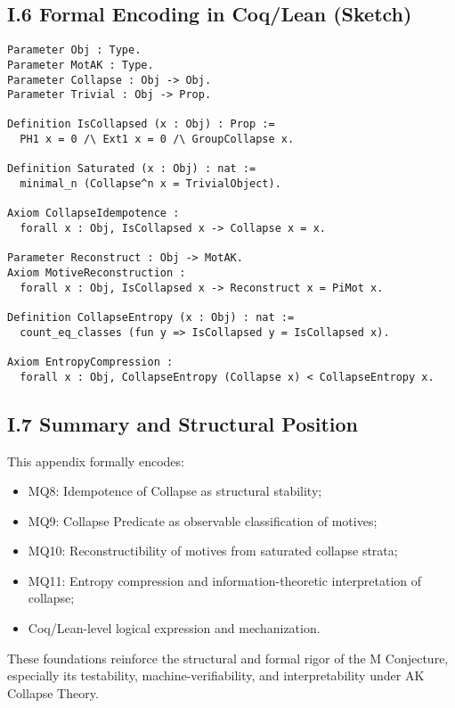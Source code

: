 \documentclass[11pt]{article}
\begin{document}
\subsection*{I.6 Formal Encoding in Coq/Lean (Sketch)}

\begin{lstlisting}[language=Coq, caption=Collapse Predicate Encoding in Coq]
Parameter Obj : Type.
Parameter MotAK : Type.
Parameter Collapse : Obj -> Obj.
Parameter Trivial : Obj -> Prop.

Definition IsCollapsed (x : Obj) : Prop :=
  PH1 x = 0 /\ Ext1 x = 0 /\ GroupCollapse x.

Definition Saturated (x : Obj) : nat :=
  minimal_n (Collapse^n x = TrivialObject).

Axiom CollapseIdempotence :
  forall x : Obj, IsCollapsed x -> Collapse x = x.

Parameter Reconstruct : Obj -> MotAK.
Axiom MotiveReconstruction :
  forall x : Obj, IsCollapsed x -> Reconstruct x = PiMot x.

Definition CollapseEntropy (x : Obj) : nat :=
  count_eq_classes (fun y => IsCollapsed y = IsCollapsed x).

Axiom EntropyCompression :
  forall x : Obj, CollapseEntropy (Collapse x) < CollapseEntropy x.
\end{lstlisting}

\subsection*{I.7 Summary and Structural Position}

This appendix formally encodes:

\begin{itemize}
  \item MQ8: Idempotence of Collapse as structural stability;
  \item MQ9: Collapse Predicate as observable classification of motives;
  \item MQ10: Reconstructibility of motives from saturated collapse strata;
  \item MQ11: Entropy compression and information-theoretic interpretation of collapse;
  \item Coq/Lean-level logical expression and mechanization.
\end{itemize}

These foundations reinforce the structural and formal rigor of the M Conjecture, especially its testability, machine-verifiability, and interpretability under AK Collapse Theory.
\end{document}
